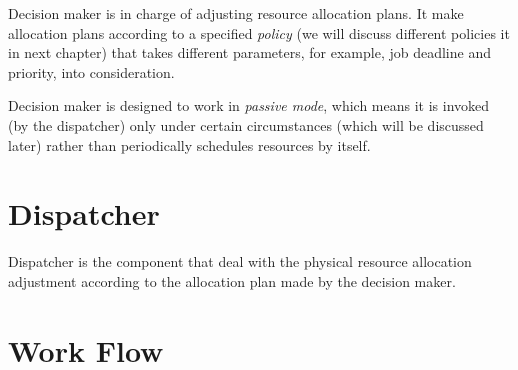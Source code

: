 Decision maker is in charge of adjusting resource allocation plans.  It
make allocation plans according to a specified \emph{policy} (we will
discuss different policies it in next chapter) that takes different
parameters, for example, job deadline and priority, into consideration. 

Decision maker is designed to work in \emph{passive mode}, which means
it is invoked (by the dispatcher) only under certain circumstances
(which will be discussed later) rather than periodically schedules
resources by itself.

\section{Dispatcher}

Dispatcher is the component that deal with the physical resource
allocation adjustment according to the allocation plan made by the
decision maker.

\section{Work Flow}

